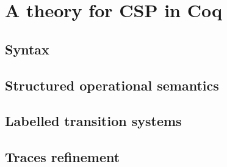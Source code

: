 \chapter{A theory for CSP in Coq}

\section{Syntax}

\section{Structured operational semantics}

\section{Labelled transition systems}

\section{Traces refinement}
